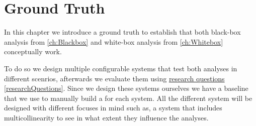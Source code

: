 \chapter{Ground Truth}\label{ch:groundtruth}
In this chapter we introduce a ground truth to establish that both black-box analysis from \autoref{ch:Blackbox} and white-box analysis from 
\autoref{ch:Whitebox} conceptually work. 

To do so we design multiple configurable systems that test both analyses in different scenrios, afterwards we evaluate
them using \hyperref[researchQuestions]{research questions \ref*{researchQuestions}}. Since we design these systems ourselves we have 
a baseline that we use to manually build a \perfInfluenceModel for each system. All the different system will be designed with different focuses in mind
such as, a system that includes multicollinearity to see in what extent they influence the analyses.



